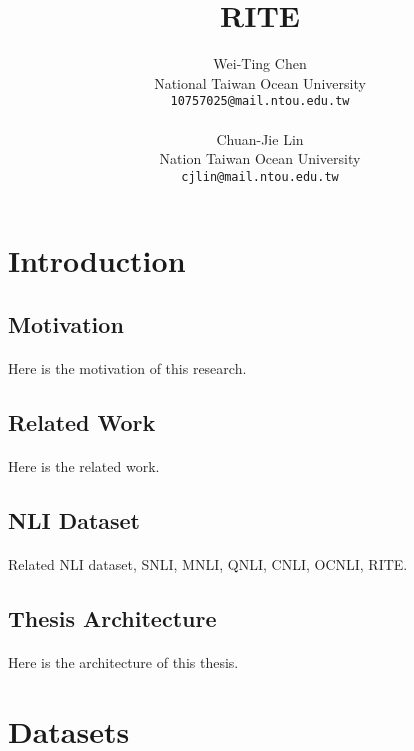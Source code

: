 \documentclass{article}
\title{RITE}
\author{
  Wei-Ting Chen\\
  National Taiwan Ocean University\\
  \texttt{10757025@mail.ntou.edu.tw}\\
  \\
  Chuan-Jie Lin\\
  Nation Taiwan Ocean University\\
  \texttt{cjlin@mail.ntou.edu.tw}\\
}
\begin{document}
\maketitle
{}

\newpage

\doublespacing
\tableofcontents
\singlespacing

\newpage

\begin{CJK*}{UTF8}{bsmi}
\section{Introduction}

\subsection{Motivation}
\paragraph{}
Here is the motivation of this research.

\subsection{Related Work}
\paragraph{}
Here is the related work.

\subsection{NLI Dataset}
\paragraph{}
Related NLI dataset, SNLI, MNLI, QNLI, CNLI, OCNLI, RITE.

\subsection{Thesis Architecture}
\paragraph{}
Here is the architecture of this thesis.

\section{Datasets}

\end{CJK*}
\end{document}
